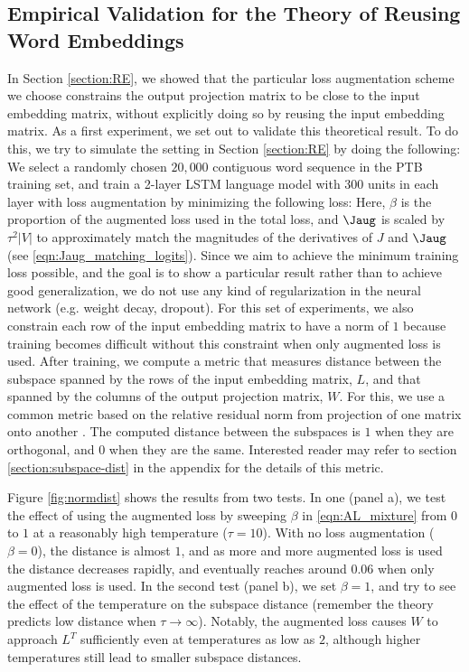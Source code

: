 \subsection{Empirical Validation for the Theory of Reusing Word Embeddings}
In Section \ref{section:RE}, we showed that the particular loss augmentation scheme we choose constrains the output projection matrix to be close to the input embedding matrix, without explicitly doing so by reusing the input embedding matrix.
As a first experiment, we set out to validate this theoretical result.
To do this, we try to simulate the setting in Section \ref{section:RE} by doing the following: We select a randomly chosen $20,000$ contiguous word sequence in the PTB training set, and train a 2-layer LSTM language model with 300 units in each layer with loss augmentation by minimizing the following loss:
Here, $\beta$ is the proportion of the augmented loss used in the total loss, and $\Jaug$ is scaled by $\tau^2|V|$ to approximately match the magnitudes of the derivatives of $J$ and $\Jaug$ (see \eqref{eqn:Jaug_matching_logits}).
Since we aim to achieve the minimum training loss possible, and the goal is to show a particular result rather than to achieve good generalization, we do not use any kind of regularization in the neural network (e.g. weight decay, dropout).
For this set of experiments, we also constrain each row of the input embedding matrix to have a norm of $1$ because training becomes difficult without this constraint when only augmented loss is used.
After training, we compute a metric that measures distance between the subspace spanned by the rows of the input embedding matrix, $L$, and that spanned by the columns of the output projection matrix, $W$. For this, we use a common metric based on the relative residual norm from projection of one matrix onto another \citep{bjorck1973numerical}.
The computed distance between the subspaces is $1$ when they are orthogonal, and $0$ when they are the same.
Interested reader may refer to section \ref{section:subspace-dist} in the appendix for the details of this metric.

Figure \ref{fig:normdist} shows the results from two tests. In one (panel a), we test the effect of using the augmented loss by sweeping $\beta$ in \eqref{eqn:AL_mixture} from $0$ to $1$ at a reasonably high temperature ($\tau=10$).
With no loss augmentation ($\beta=0$), the distance is almost $1$, and as more and more augmented loss is used the distance decreases rapidly, and eventually reaches around $0.06$ when only augmented loss is used.
In the second test (panel b), we set $\beta=1$, and try to see the effect of the temperature on the subspace distance (remember the theory predicts low distance when $\tau \rightarrow \infty$).
Notably, the augmented loss causes $W$ to approach $L^T$ sufficiently even at temperatures as low as $2$, although higher temperatures still lead to smaller subspace distances.

